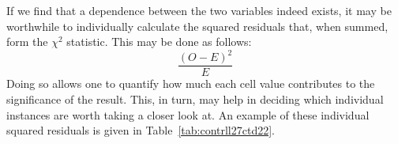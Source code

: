 If we find that a dependence between the two variables indeed exists, it may be worthwhile to individually calculate the squared residuals that, when summed, form the \(\chi^2\) statistic. This may be done as follows:
\[\frac{(O-E)^2}{E}\]
Doing so allows one to quantify how much each cell value contributes to the significance of the result. This, in turn, may help in deciding which individual instances are worth taking a closer look at. An example of these individual squared residuals is given in Table~\ref{tab:contrll27ctd22}.




